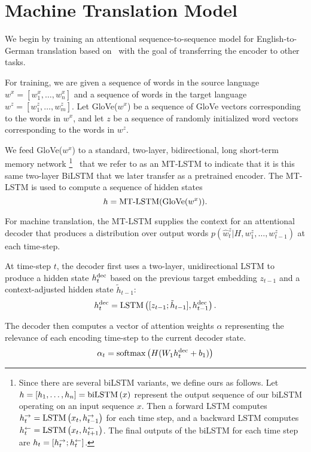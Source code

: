 \section{Machine Translation Model}

We begin by training an attentional sequence-to-sequence model for English-to-German translation based on~\citet{2017opennmt} with the goal of transferring the encoder to other tasks.

For training, 
we are given a sequence of words in the source language 
$w^{x}=[w^{x}_1, \ldots, w^{x}_n]$ 
and a sequence of words in the target language
$w^{z}=[w^{z}_1, \ldots, w^{z}_m]$. 
Let GloVe($w^x$)
be a sequence of GloVe vectors corresponding to the words in $w^x$,
and let $z$ be a sequence of randomly initialized word vectors corresponding to the words in $w^z$.

We feed GloVe($w^x$) to a standard, two-layer, bidirectional, long short-term memory network
\footnote{
Since there are several biLSTM variants, we define ours as follows. Let $h=[h_1, \ldots, h_n]={\rm biLSTM} \left( x \right)$ represent the output sequence of our biLSTM operating on an input sequence $x$. Then a forward LSTM computes $h^{\rightarrow}_t = {\rm LSTM} \left( x_t , h^{\rightarrow}_{t-1} \right)$ 
for each time step, and a backward LSTM computes 
$h^{\leftarrow}_t = {\rm LSTM} \left( x_t , h^{\leftarrow}_{t+1} \right)$.
The final outputs of the biLSTM for each time step are 
$h_t = \left[ h^{\rightarrow}_t; h^{\leftarrow}_t \right]$.
}~\citep{graves2005framewise} 
that we refer to as an MT-LSTM 
to indicate that it is this same two-layer BiLSTM that we later transfer as a pretrained encoder.
The MT-LSTM  is used to compute a sequence of hidden states
\begin{equation}
h = \text{\rm MT-LSTM}(\text{GloVe}(w^x)).
\label{eq:mtlstm}
\end{equation}

For machine translation, 
the MT-LSTM supplies the context for an attentional decoder 
that produces a distribution over output words 
$p(\hat{w}^z_t|H,w^z_1,\ldots,w^z_{t-1})$ at each time-step.

At time-step $t$, 
the decoder first uses a two-layer, 
unidirectional LSTM to produce a hidden state $h^{\rm dec}_t$ 
based on the previous target embedding $z_{t-1}$ 
and a context-adjusted hidden state $\tilde h_{t-1}$:
\begin{equation}
h^{\rm dec}_{t} = {\rm LSTM} \left(  [ z_{t-1}; \tilde h_{t-1} ]  , h^{\rm dec}_{t-1} \right).
\end{equation}

The decoder then computes a vector of attention weights $\alpha$ 
representing the relevance of each encoding time-step to the current decoder state.
\begin{equation}
\alpha_{t} = {\rm softmax} \left( H (W_1 h^{\rm dec}_{t} + b_1) \right)
\end{equation}

